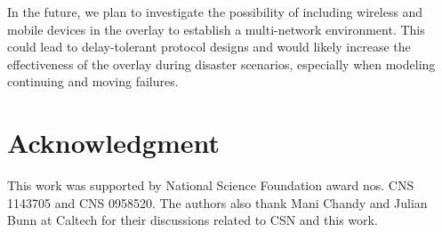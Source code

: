 \documentclass[conference]{IEEEtran}
\begin{document}
In the future, we plan to investigate the possibility of including wireless and mobile devices in the overlay to establish a multi-network environment.
This could lead to delay-tolerant protocol designs and would likely increase the effectiveness of the overlay during disaster scenarios, especially when modeling continuing and moving failures.


\section*{Acknowledgment}

This work was supported by National Science Foundation award nos. CNS 1143705 and CNS 0958520.
The authors also thank Mani Chandy and Julian Bunn at Caltech for their discussions related to CSN and this work.


%
%



%
%
\end{document}
